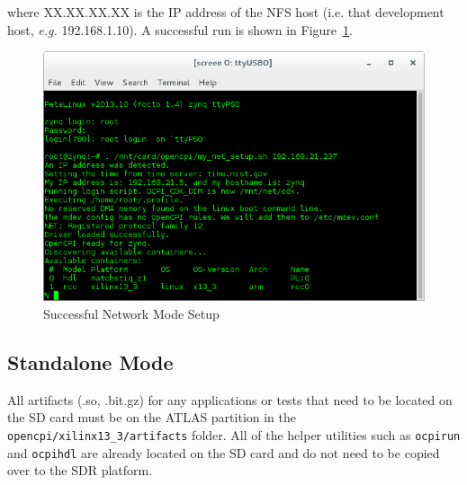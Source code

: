 \begin{enumerate}
\begin{flushleft}
where XX.XX.XX.XX is the IP address of the NFS host (i.e. that development host, \textit{e.g.} 192.168.1.10). A successful run is shown in Figure~\ref{fig:netsetup}.
\end{flushleft}

\begin{figure}[H]
	\centerline{\includegraphics[scale=0.5]{Matchstiq_Z1_net_setup}}
	\caption{Successful Network Mode Setup}
	\label{fig:netsetup}
\end{figure} \medskip



\end{enumerate}

\pagebreak
\subsection{Standalone Mode}
All artifacts (.so, .bit.gz) for any applications or tests that need to be located on the SD card must be on the ATLAS partition in the \texttt{opencpi/xilinx13\_3/artifacts} folder.  All of the helper utilities such as \texttt{ocpirun} and \texttt{ocpihdl} are already located on the SD card and do not need to be copied over to the SDR platform.

